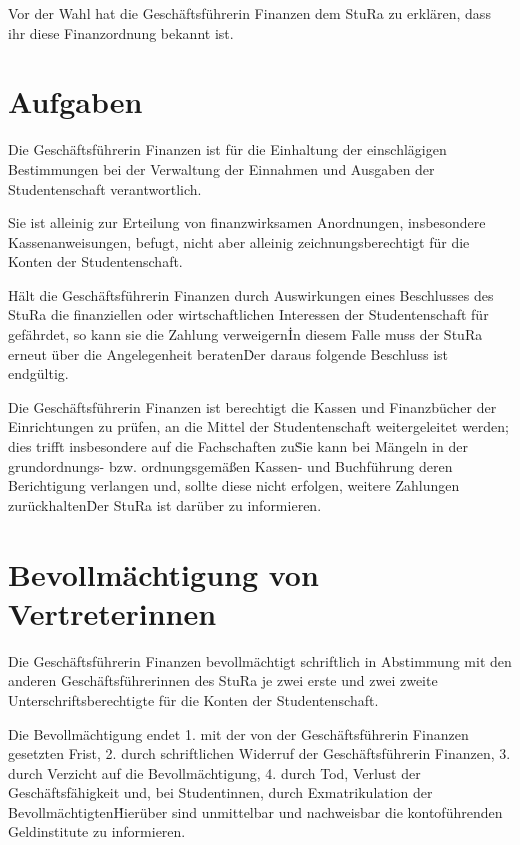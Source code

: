 {\begin{multicols}{2}
\Abs \Satz Vor der Wahl hat die Geschäftsführerin Finanzen dem StuRa zu erklären, dass ihr diese Finanzordnung bekannt ist.



\section{Aufgaben}

\Abs \Satz Die Geschäftsführerin Finanzen ist für die Einhaltung der einschlägigen Bestimmungen bei der Verwaltung der Einnahmen und Ausgaben der Studentenschaft verantwortlich.

\Abs \Satz Sie ist alleinig zur Erteilung von finanzwirksamen Anordnungen, insbesondere Kassenanweisungen, befugt, nicht aber alleinig zeichnungsberechtigt für die Konten der Studentenschaft.

\Abs \Satz Hält die Geschäftsführerin Finanzen durch Auswirkungen eines Beschlusses des StuRa die finanziellen oder wirtschaftlichen Interessen der Studentenschaft für gefährdet, so kann sie die Zahlung verweigern\. In diesem Falle muss der StuRa erneut über die Angelegenheit beraten\. Der daraus folgende Beschluss ist endgültig.

\Abs \Satz Die Geschäftsführerin Finanzen ist berechtigt die Kassen und Finanzbücher der Einrichtungen zu prüfen, an die Mittel der Studentenschaft weitergeleitet werden; dies trifft insbesondere auf die Fachschaften zu\. Sie kann bei Mängeln in der grundordnungs- bzw. ordnungsgemäßen Kassen- und Buchführung deren Berichtigung verlangen und, sollte diese nicht erfolgen, weitere Zahlungen zurückhalten\. Der StuRa ist darüber zu informieren.



\section{Bevollmächtigung von Vertreterinnen}

\Abs \Satz Die Geschäftsführerin Finanzen bevollmächtigt schriftlich in Abstimmung mit den anderen Geschäftsführerinnen des StuRa je zwei erste und zwei zweite Unterschriftsberechtigte für die Konten der Studentenschaft.

\Abs \Satz Die Bevollmächtigung endet
1. mit der von der Geschäftsführerin Finanzen gesetzten Frist,
2. durch schriftlichen Widerruf der Geschäftsführerin Finanzen,
3. durch Verzicht auf die Bevollmächtigung,
4. durch Tod, Verlust der Geschäftsfähigkeit und, bei Studentinnen, durch Exmatrikulation der Bevollmächtigten\. Hierüber sind unmittelbar und nachweisbar die kontoführenden Geldinstitute zu informieren.


\end{multicols}}
